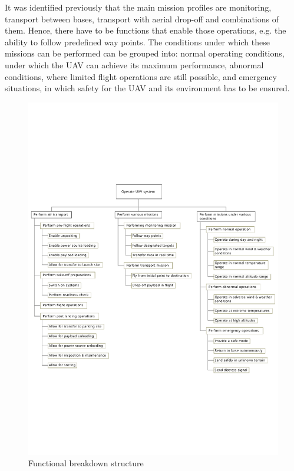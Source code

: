 It was identified previously that the main mission profiles are monitoring, transport between bases, transport with aerial drop-off and combinations of them. Hence, there have to be functions that enable those operations, e.g. the ability to follow predefined way points. The conditions under which these missions can be performed can be grouped into: normal operating conditions, under which the UAV can achieve its maximum performance, abnormal conditions, where limited flight operations are still possible, and emergency situations, in which safety for the UAV and its environment has to be ensured. 


\begin{figure}[htb]
\includegraphics[width=\textwidth]{./ProjectDescription/Figures/FBS}
\caption{Functional breakdown structure}
\label{fig:FBS}
\end{figure}


